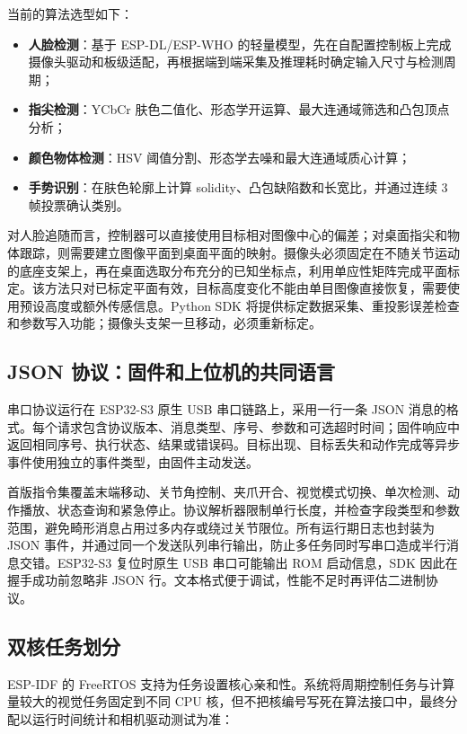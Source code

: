 当前的算法选型如下：

\begin{itemize}
  \item \textbf{人脸检测}：基于 ESP-DL/ESP-WHO 的轻量模型，先在自配置控制板上完成摄像头驱动和板级适配，再根据端到端采集及推理耗时确定输入尺寸与检测周期；
  \item \textbf{指尖检测}：YCbCr 肤色二值化、形态学开运算、最大连通域筛选和凸包顶点分析；
  \item \textbf{颜色物体检测}：HSV 阈值分割、形态学去噪和最大连通域质心计算；
  \item \textbf{手势识别}：在肤色轮廓上计算 solidity、凸包缺陷数和长宽比，并通过连续 3 帧投票确认类别。
\end{itemize}

对人脸追随而言，控制器可以直接使用目标相对图像中心的偏差；对桌面指尖和物体跟踪，则需要建立图像平面到桌面平面的映射。摄像头必须固定在不随关节运动的底座支架上，再在桌面选取分布充分的已知坐标点，利用单应性矩阵完成平面标定。该方法只对已标定平面有效，目标高度变化不能由单目图像直接恢复，需要使用预设高度或额外传感信息。Python SDK 将提供标定数据采集、重投影误差检查和参数写入功能；摄像头支架一旦移动，必须重新标定。

\subsection{JSON 协议：固件和上位机的共同语言}

串口协议运行在 ESP32-S3 原生 USB 串口链路上，采用一行一条 JSON 消息的格式。每个请求包含协议版本、消息类型、序号、参数和可选超时时间；固件响应中返回相同序号、执行状态、结果或错误码。目标出现、目标丢失和动作完成等异步事件使用独立的事件类型，由固件主动发送。

首版指令集覆盖末端移动、关节角控制、夹爪开合、视觉模式切换、单次检测、动作播放、状态查询和紧急停止。协议解析器限制单行长度，并检查字段类型和参数范围，避免畸形消息占用过多内存或绕过关节限位。所有运行期日志也封装为 JSON 事件，并通过同一个发送队列串行输出，防止多任务同时写串口造成半行消息交错。ESP32-S3 复位时原生 USB 串口可能输出 ROM 启动信息，SDK 因此在握手成功前忽略非 JSON 行。文本格式便于调试，性能不足时再评估二进制协议。

\subsection{双核任务划分}

ESP-IDF 的 FreeRTOS 支持为任务设置核心亲和性。系统将周期控制任务与计算量较大的视觉任务固定到不同 CPU 核，但不把核编号写死在算法接口中，最终分配以运行时间统计和相机驱动测试为准：

